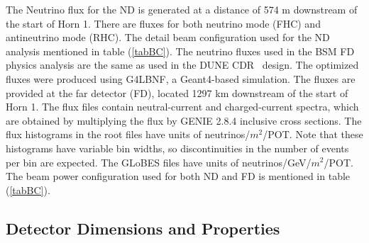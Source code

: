 The Neutrino flux for the ND is generated at a distance of 574 m downstream of the start of Horn 1. There are fluxes for both neutrino mode (FHC) and antineutrino mode (RHC). The detail beam configuration used for the ND analysis mentioned in table (\ref{tabBC}).
The neutrino fluxes used in the BSM FD physics analysis are the same as used in the DUNE CDR~\cite{Strait:2016mof} design. The optimized fluxes were produced using G4LBNF, a Geant4-based simulation.  The  fluxes are provided at the far detector (FD), located 1297 km downstream of the start of Horn 1. The flux files  contain neutral-current and charged-current spectra, which are obtained by multiplying the flux by GENIE 2.8.4 inclusive cross sections.  The flux histograms in the root files have
units of neutrinos/$m^{2}$/POT. Note that these histograms have variable bin widths, so discontinuities in the number of events per bin are expected. The GLoBES files have units of neutrinos/GeV/$m^{2}$/POT.\\
The beam power configuration used for both ND and FD is mentioned in table (\ref{tabBC}).
\begin{table}[h]
    \begin{center}
        \end{center}
        \caption{\label{tabBC} Beam Power Configurations used for ND and FD }
    \end{table} 
\subsection{Detector Dimensions and Properties}
